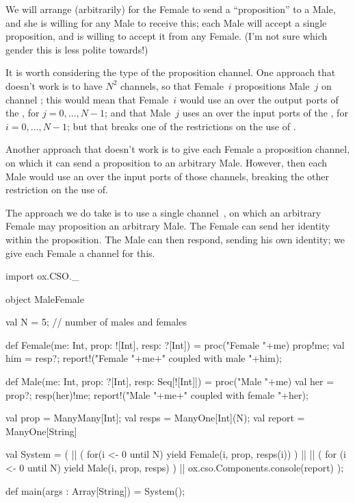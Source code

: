\begin{answer}
We will arrange (arbitrarily) for the Female to send a ``proposition'' to a
Male, and she is willing for any Male to receive this; each Male will accept a
single proposition, and is willing to accept it from any Female.  (I'm not
sure which gender this is less polite towards!)   

It is worth considering the type of the proposition channel.  One approach
that doesn't work is to have $N^2$  channels, so that Female~$i$
propositions Male~$j$ on channel ; this would mean that
Female~$i$ would use an  over the output ports of the
, for $j = 0, \ldots, N-1$; and that Male~$j$ uses an
 over the input ports of the , for $i = 0,
\ldots, N-1$; but that breaks one of the restrictions on the use of
.

Another approach that doesn't work is to give each Female a 
proposition channel, on which it can send a proposition to an arbitrary Male.
However, then each Male would use an  over the input ports of those
channels, breaking the other restriction on the use of.

The approach we do take is to use a single 
channel~, on which an arbitrary Female may proposition an
arbitrary Male.  The Female can send her identity within the proposition.  The
Male can then respond, sending his own identity; we give each Female a
 channel for this.
%
\begin{scala}
import ox.CSO._

object MaleFemale{
  val N = 5; // number of males and females

  def Female(me: Int, prop: ![Int], resp: ?[Int]) 
  = proc("Female "+me){
    prop!me;
    val him = resp?;
    report!("Female "+me+" coupled with male "+him);
  }

  def Male(me: Int, prop: ?[Int], resp: Seq[![Int]]) 
  = proc("Male "+me){
    val her = prop?;
    resp(her)!me;
    report!("Male "+me+" coupled with female "+her);
  }

  val prop = ManyMany[Int];
  val resps = ManyOne[Int](N);
  val report = ManyOne[String]

  val System = (
    || ( for(i <- 0 until N) 
           yield Female(i, prop, resps(i)) )
    || 
    || ( for (i <- 0 until N) 
           yield Male(i, prop, resps) )
    || ox.cso.Components.console(report) 
  );

  def main(args : Array[String]) = System();
}
\end{scala}
\end{answer}

    
